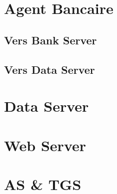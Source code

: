 \documentclass[11pt,fleqn]{article}
\begin{document}
\section{Agent Bancaire}
\subsection{Vers Bank Server}
\subsection{Vers Data Server}
\section{Data Server}
\section{Web Server}
\section{AS \& TGS}
\end{document}
